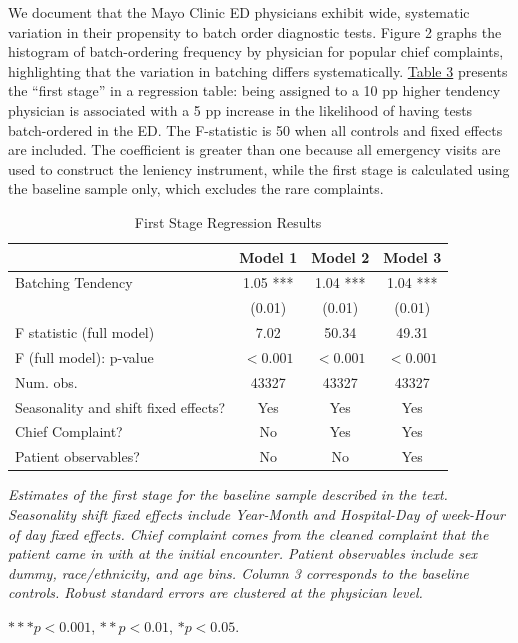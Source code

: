 \documentclass[,,nonblindrev]{informs}
\begin{document}
We document that the Mayo Clinic ED physicians exhibit wide, systematic
variation in their propensity to batch order diagnostic tests. Figure 2
graphs the histogram of batch-ordering frequency by physician for
popular chief complaints, highlighting that the variation in batching
differs systematically. \hyperref[tab:regression]{Table 3} presents the
``first stage'' in a regression table: being assigned to a 10 pp higher
tendency physician is associated with a 5 pp increase in the likelihood
of having tests batch-ordered in the ED. The F-statistic is 50 when all
controls and fixed effects are included. The coefficient is greater than
one because all emergency visits are used to construct the leniency
instrument, while the first stage is calculated using the baseline
sample only, which excludes the rare complaints.

\begin{table}[ht]
\centering
\caption{First Stage Regression Results}
\label{tab:regression}
\begin{tabular}{p{9cm}ccc}
\toprule
\textbf{} & \textbf{Model 1} & \textbf{Model 2} & \textbf{Model 3} \\
\midrule
Batching Tendency & 1.05 *** & 1.04 *** & 1.04 *** \\
 & (0.01) & (0.01) & (0.01) \\
\midrule
F statistic (full model) & 7.02 & 50.34 & 49.31  \\  
F (full model): p-value & $<0.001$ & $<0.001$ & $<0.001$ \\
\midrule
Num. obs. & 43327 & 43327 & 43327 \\
Seasonality and shift fixed effects? & Yes & Yes & Yes \\
Chief Complaint? & No & Yes & Yes \\
Patient observables? & No & No & Yes \\
\bottomrule
\end{tabular}
\begin{tablenotes}
\small
\item \textit{Estimates of the first stage for the baseline sample described in the text. Seasonality shift fixed effects include Year-Month and Hospital-Day of week-Hour of day fixed effects. Chief complaint comes from the cleaned complaint that the patient came in with at the initial encounter. Patient observables include sex dummy, race/ethnicity, and age bins. Column 3 corresponds to the baseline controls. Robust standard errors are clustered at the physician level.}
\item $*** p < 0.001$, $** p < 0.01$, $* p < 0.05$.
\end{tablenotes}
\end{table}
\end{document}
